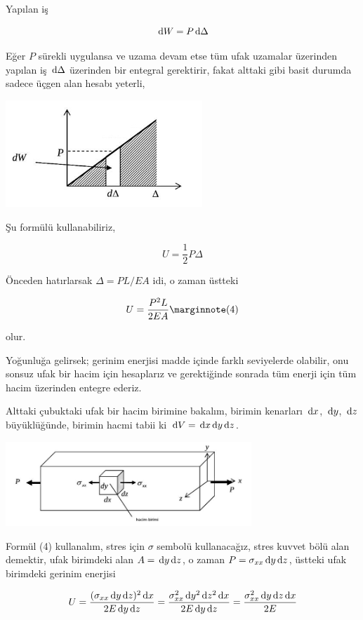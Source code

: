 \documentclass[12pt,fleqn]{article}\usepackage{../../common}
\begin{document}
Yapılan iş

$$
\,\mathrm{d} W = P \,\mathrm{d} \Delta
$$

Eğer $P$ sürekli uygulansa ve uzama devam etse tüm ufak uzamalar üzerinden
yapılan iş $\,\mathrm{d} \Delta$ üzerinden bir entegral gerektirir, fakat alttaki
gibi basit durumda sadece üçgen alan hesabı yeterli,

\includegraphics[width=20em]{phy_020_strs_00_08.jpg}

Şu formülü kullanabiliriz,

$$
U = \frac{1}{2} P \Delta
$$

Önceden hatırlarsak $\Delta = PL / EA$ idi, o zaman üstteki 

$$
U = \frac{P^2 L}{2 E A}
\mlabel{4}
$$

olur.

Yoğunluğa gelirsek; gerinim enerjisi madde içinde farklı seviyelerde olabilir,
onu sonsuz ufak bir hacim için hesaplarız ve gerektiğinde sonrada tüm enerji
için tüm hacim üzerinden entegre ederiz.

Alttaki çubuktaki ufak bir hacim birimine bakalım, birimin kenarları $\,\mathrm{d} x$,
$\,\mathrm{d} y$, $\,\mathrm{d} z$ büyüklüğünde, birimin hacmi tabii ki $\,\mathrm{d} V = \,\mathrm{d} x \,\mathrm{d} y \,\mathrm{d}
z$.

\includegraphics[width=25em]{phy_020_strs_00_06.jpg}

Formül (4) kullanalım, stres için $\sigma$ sembolü kullanacağız, stres kuvvet
bölü alan demektir, ufak birimdeki alan $A = \,\mathrm{d} y \,\mathrm{d} z$, o zaman
$P = \sigma_{xx} \,\mathrm{d} y \,\mathrm{d} z$, üstteki ufak birimdeki gerinim enerjisi

$$
U = \frac{(\sigma_{xx} \,\mathrm{d} y \,\mathrm{d} z)^2 \,\mathrm{d} x}{2 E \,\mathrm{d} y \,\mathrm{d} z} =
\frac{\sigma_{xx}^2 \,\mathrm{d} y^2 \,\mathrm{d} z^2 \,\mathrm{d} x}{2 E \,\mathrm{d} y \,\mathrm{d} z} =
\frac{\sigma_{xx}^2 \,\mathrm{d} y \,\mathrm{d} z \,\mathrm{d} x}{2 E} 
$$
\end{document}
